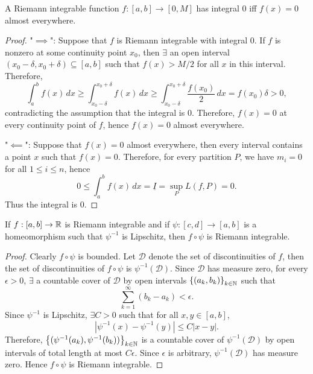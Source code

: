 \begin{cl}
    A Riemann integrable function $f: [a, b] \to [0, M]$ has integral $0$ iff $f(x) = 0$ almost everywhere.
    \begin{proof}
        "$\implies$": Suppose that $f$ is Riemann integrable with integral $0$. If $f$ is nonzero at some continuity point $x_0$, then $\exists$ an open interval $(x_0 - \delta, x_0 + \delta) \subseteq [a, b]$ such that $f(x) > M/2$ for all $x$ in this interval. Therefore,
        \[
        \int_a^b f(x) \, dx \geq \int_{x_0 - \delta}^{x_0 + \delta} f(x) \, dx \geq \int_{x_0 - \delta}^{x_0 + \delta} \frac{f(x_0)}{2} \, dx = f(x_0)\delta > 0,
        \]
        contradicting the assumption that the integral is $0$. Therefore, $f(x) = 0$ at every continuity point of $f$, hence $f(x) = 0$ almost everywhere.

        "$\impliedby$": Suppose that $f(x) = 0$ almost everywhere, then every interval contains a point $x$ such that $f(x) = 0$. Therefore, for every partition $P$, we have $m_i = 0$ for all $1 \leq i \leq n$, hence
        \[
        0 \leq \int_a^b f(x) \, dx = \underline{I} = \sup_P L(f, P) = 0.
        \]
        Thus the integral is $0$.
    \end{proof}
\end{cl}

\begin{cl}
    If $f: [a, b] \to {\mathbb R}$ is Riemann integrable and if $\psi: [c, d] \to [a, b]$ is a homeomorphism such that $\psi^{-1}$ is Lipschitz, then $f \circ \psi$ is Riemann integrable.
    \begin{proof}
        Clearly $f \circ \psi$ is bounded. Let $\mathcal D$ denote the set of discontinuities of $f$, then the set of discontinuities of $f \circ \psi$ is $\psi^{-1}(\mathcal D)$. Since $\mathcal D$ has measure zero, for every $\epsilon > 0$, $\exists$ a countable cover of $\mathcal D$ by open intervals ${\left\{{(a_k, b_k)}\right\}}_{k \in {\mathbb N}}$ such that
        \[
        \sum_{k=1}^\infty (b_k - a_k) < \epsilon.
        \]
        Since $\psi^{-1}$ is Lipschitz, $\exists C > 0$ such that for all $x, y \in [a, b]$,
        \[
        |\psi^{-1}(x) - \psi^{-1}(y)| \leq C |x - y|.
        \]
        Therefore, ${\left\{{(\psi^{-1}(a_k), \psi^{-1}(b_k))}\right\}}_{k \in {\mathbb N}}$ is a countable cover of $\psi^{-1}(\mathcal D)$ by open intervals of total length at most $C \epsilon$. Since $\epsilon$ is arbitrary, $\psi^{-1}(\mathcal D)$ has measure zero. Hence $f \circ \psi$ is Riemann integrable.
    \end{proof}
\end{cl}

